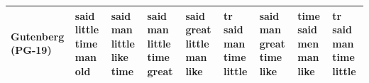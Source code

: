 \documentclass[11pt,a4paper]{article}
\begin{document}
\begin{appendices}
\begin{table}[htb]
\begin{tiny}
\begin{tabular}{|p{}|p{}|p{}|p{}|p{}|p{}|p{}|p{}|p{}|}
    Gutenberg (PG-19) & said \newline little \newline time \newline man \newline old & said \newline man \newline little \newline like \newline time & said \newline man \newline little \newline time \newline great & said \newline great \newline little \newline man \newline like & tr \newline said \newline man \newline time \newline little & said \newline man \newline great \newline time \newline like & time \newline said \newline men \newline man \newline like & tr \newline said \newline man \newline time \newline little\\\hline

\end{tabular}
\end{tiny}
\end{table}
\end{appendices}
\end{document}
